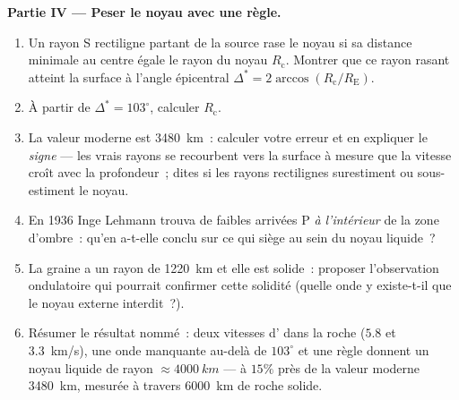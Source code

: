 \begin{problem}
\medskip\noindent\textbf{Partie IV --- Peser le noyau avec une règle.}
\begin{enumerate}[resume]
  \item Un rayon S rectiligne partant de la source rase le noyau si sa
        distance minimale au centre égale le rayon du noyau
        $R_{\text{c}}$. Montrer que ce rayon rasant atteint la surface
        à l'angle épicentral $\Delta^* =
        2\arccos(R_{\text{c}}/R_{\text{E}})$.
  \item À partir de $\Delta^* = 103^\circ$, calculer $R_{\text{c}}$.
  \item La valeur moderne est \qty{3480}{km}~: calculer votre erreur et
        en expliquer le \emph{signe} --- les vrais rayons se recourbent
        vers la surface à mesure que la vitesse croît avec la
        profondeur~; dites si les rayons rectilignes surestiment ou
        sous-estiment le noyau.
  \item En 1936 Inge Lehmann trouva de faibles arrivées P
        \emph{à l'intérieur} de la zone d'ombre~: qu'en a-t-elle
        conclu sur ce qui siège au sein du noyau liquide~?
  \item La graine a un rayon de \qty{1220}{km} et elle est solide~:
        proposer l'observation ondulatoire qui pourrait confirmer cette
        solidité (quelle onde y existe-t-il que le noyau externe
        interdit~?).
  \item Résumer le résultat nommé~: deux vitesses d'
        dans la roche ($5.8$ et \qty{3.3}{km/s}), une onde manquante
        au-delà de $103^\circ$ et une règle donnent un noyau liquide de
        rayon $\approx \qty{4000}{km}$ --- à $15\%$ près de la valeur
        moderne \qty{3480}{km}, mesurée à travers \qty{6000}{km} de
        roche solide.
\end{enumerate}
\end{problem}
